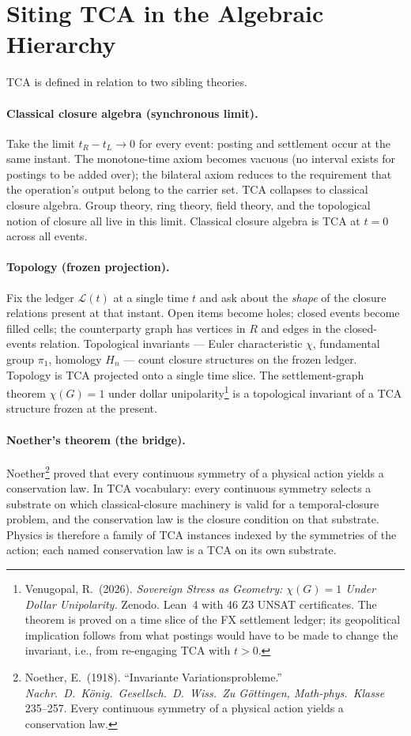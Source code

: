 \documentclass[11pt]{article}
\begin{document}
\section{Siting TCA in the Algebraic Hierarchy}

TCA is defined in relation to two sibling theories.

\paragraph{Classical closure algebra (synchronous limit).} Take the limit $t_R - t_L \to 0$ for every event: posting and settlement occur at the same instant. The monotone-time axiom becomes vacuous (no interval exists for postings to be added over); the bilateral axiom reduces to the requirement that the operation's output belong to the carrier set. TCA collapses to classical closure algebra. Group theory, ring theory, field theory, and the topological notion of closure all live in this limit. Classical closure algebra is TCA at $t = 0$ across all events.

\paragraph{Topology (frozen projection).} Fix the ledger $\mathcal{L}(t)$ at a single time $t$ and ask about the \emph{shape} of the closure relations present at that instant. Open items become holes; closed events become filled cells; the counterparty graph has vertices in $R$ and edges in the closed-events relation. Topological invariants — Euler characteristic $\chi$, fundamental group $\pi_1$, homology $H_n$ — count closure structures on the frozen ledger. Topology is TCA projected onto a single time slice. The settlement-graph theorem $\chi(G) = 1$ under dollar unipolarity\footnote{Venugopal, R.\ (2026). \emph{Sovereign Stress as Geometry: $\chi(G)=1$ Under Dollar Unipolarity.} Zenodo. Lean~4 with 46 Z3 UNSAT certificates. The theorem is proved on a time slice of the FX settlement ledger; its geopolitical implication follows from what postings would have to be made to change the invariant, i.e., from re-engaging TCA with $t > 0$.} is a topological invariant of a TCA structure frozen at the present.

\paragraph{Noether's theorem (the bridge).} Noether\footnote{Noether, E.\ (1918). ``Invariante Variationsprobleme.'' \emph{Nachr.\ D.\ König.\ Gesellsch.\ D.\ Wiss.\ Zu Göttingen, Math-phys.\ Klasse} 235--257. Every continuous symmetry of a physical action yields a conservation law.} proved that every continuous symmetry of a physical action yields a conservation law. In TCA vocabulary: every continuous symmetry selects a substrate on which classical-closure machinery is valid for a temporal-closure problem, and the conservation law is the closure condition on that substrate. Physics is therefore a family of TCA instances indexed by the symmetries of the action; each named conservation law is a TCA on its own substrate.
\end{document}
